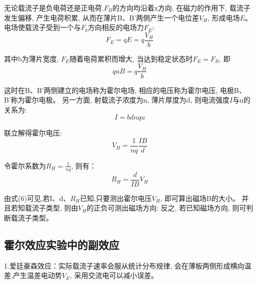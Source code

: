 \documentclass[a4paper]{article}
\begin{document}
    \hspace{2.6cm}{\small 图一}\hspace{6.8cm}{\small 图二}

    {
        无论载流子是负电荷还是正电荷,$F_B$的方向均沿着x方向,
        在磁力的作用下, 载流子发生偏移, 产生电荷积累,
        从而在薄片B、B'两侧产生一个电位差$V_H$, 形成电场$E$。
    电场使载流子受到一个与$F_b$方向相反的电场力$F_E$:
        \begin{equation}
            F_E=qE=q\frac{V_H}{b}\label{eq:equation4}
        \end{equation}
    }

    {
        其中b为薄片宽度, $F_E$随着电荷累积而增大,
        当达到稳定状态时$F_E=F_B$, 即
        \begin{equation}
            quB = q\frac{V_H}{b}\label{eq:equation5}
        \end{equation}
    }

    {
        这时在B、B'两侧建立的电场称为霍尔电场,
        相应的电压称为霍尔电压, 电极B、B'称为霍尔电极。
    另一方面, 射载流子浓度为n, 薄片厚度为d,
        则电流强度$I$与u的关系为:
        \begin{equation}
            I=b d n q u\label{eq:equation6}
        \end{equation}
    }

    {
        联立解得霍尔电压:
        \begin{equation}
            V_H=\frac{1}{nq}\frac{IB}{d}\label{eq:equation3}
        \end{equation}
    }

    {
        令霍尔系数为$R_H=\frac{1}{nq}$, 则有：
        \begin{equation}
            R_H=\frac{d}{IB}V_H\label{eq:equation1}
        \end{equation}
    }

    {
        由式(6)可见,若I、d、$R_H$已知,只要测出霍尔电压$V_H$,
        即可算出磁场B的大小。
        并且若知载流子类型, 则由$V_H$的正负可测出磁场方向:
    反之, 若已知磁场方向, 则可判断载流子类型。
    }

    \subsection{霍尔效应实验中的副效应}

    {
        1.爱廷豪森效应：实际载流子速率会服从统计分布规律,
        会在薄板两侧形成横向温差,产生温差电动势$V_E$,
        采用交流电可以减小误差。
    }
\end{document}
